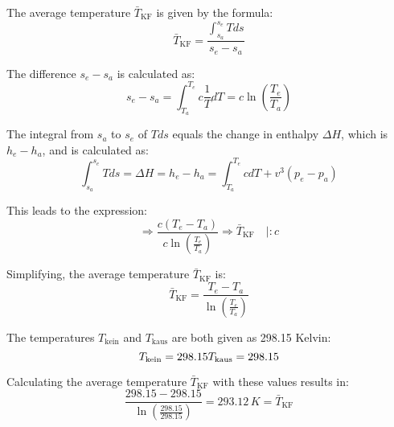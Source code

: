 The average temperature \( \bar{T}_{\text{KF}} \) is given by the formula:
\[
\bar{T}_{\text{KF}} = \frac{\int_{s_a}^{s_e} T ds}{s_e - s_a}
\]

The difference \( s_e - s_a \) is calculated as:
\[
s_e - s_a = \int_{T_a}^{T_e} c \frac{1}{T} dT = c \ln \left( \frac{T_e}{T_a} \right)
\]

The integral from \( s_a \) to \( s_e \) of \( T ds \) equals the change in enthalpy \( \Delta H \), which is \( h_e - h_a \), and is calculated as:
\[
\int_{s_a}^{s_e} T ds = \Delta H = h_e - h_a = \int_{T_a}^{T_e} c dT + v^3 \left( p_e - p_a \right)
\]

This leads to the expression:
\[
\Rightarrow \frac{c \left( T_e - T_a \right)}{c \ln \left( \frac{T_e}{T_a} \right)} \Rightarrow \bar{T}_{\text{KF}} \quad | : c
\]

Simplifying, the average temperature \( \bar{T}_{\text{KF}} \) is:
\[
\bar{T}_{\text{KF}} = \frac{T_e - T_a}{\ln \left( \frac{T_e}{T_a} \right)}
\]

The temperatures \( T_{\text{kein}} \) and \( T_{\text{kaus}} \) are both given as 298.15 Kelvin:
\[
T_{\text{kein}} = 298.15 \\
T_{\text{kaus}} = 298.15
\]

Calculating the average temperature \( \bar{T}_{\text{KF}} \) with these values results in:
\[
\frac{298.15 - 298.15}{\ln \left( \frac{298.15}{298.15} \right)} = 293.12\,K = \bar{T}_{\text{KF}}
\]